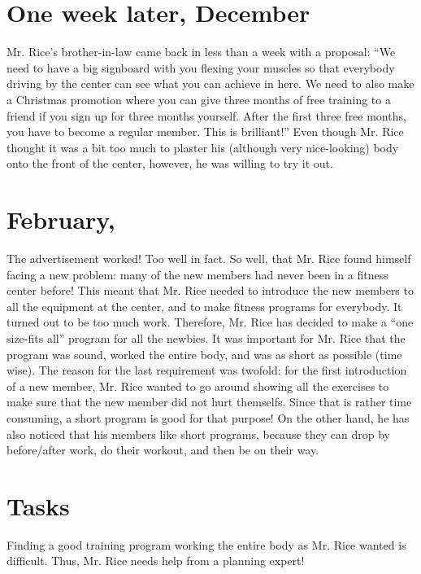 \documentclass[11pt]{article}
\begin{document}
\section*{One week later, December \the\numexpr\the{}\relax}
Mr. Rice's brother-in-law came back in less than a week with a proposal: ``We need to have a big signboard with you flexing your muscles so that everybody driving by the center can see what you can achieve in here. We need to also make a Christmas promotion where you can give three months of free training to a friend if you sign up for three months yourself. After the first three free months, you have to become a regular member. This is brilliant!'' Even though Mr. Rice thought it was a bit too much to plaster his (although very nice-looking) body onto the front of the center, however, he was willing to try it out.

\section*{February, \the\year}
The advertisement worked! Too well in fact. So well, that Mr. Rice found himself facing a new problem: many of the new members had never been in a fitness center before! This meant that Mr. Rice needed to introduce the new members to all the equipment at the center, and to make fitness programs for everybody. It turned out to be too much work. Therefore, Mr. Rice has decided to make a ``one size-fits all'' program for all the newbies. It was important for Mr. Rice that the program was sound, worked the entire body, and was as short as possible (time wise). The reason for the last requirement was twofold: for the first introduction of a new member, Mr. Rice wanted to go around showing all the exercises to make sure that the new member did not hurt themselfs. Since that is rather time consuming, a short program is good for that purpose! On the other hand, he has also noticed that his members like short programs, because they can drop by before/after work, do their workout, and then be on their way. 

\section*{Tasks}
Finding a good training program working the entire body as Mr. Rice wanted is difficult. Thus, Mr. Rice needs help from a planning expert!
\end{document}
